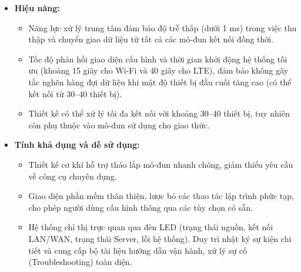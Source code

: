 \begin{itemize}
            \item \textbf{Hiệu năng:}
            \begin{itemize}
                \item Năng lực xử lý trung tâm đảm bảo độ trễ thấp (dưới 1 ms) trong việc thu thập và chuyển giao dữ liệu từ tất cả các mô-đun kết nối đồng thời.
                \item Tốc độ phản hồi giao diện cấu hình và thời gian khởi động hệ thống tối ưu (khoảng 15 giây cho Wi-Fi và 40 giây cho LTE), đảm bảo không gây tắc nghẽn hàng đợi dữ liệu khi mật độ thiết bị đầu cuối tăng cao (có thể kết nối từ 30--40 thiết bị).
                \item Thiết kế có thể xử lý tối đa kết nối với khoảng 30--40 thiết bị, tuy nhiên còn phụ thuộc vào mô-đun sử dụng cho giao thức.
            \end{itemize}
            
            \item \textbf{Tính khả dụng và dễ sử dụng:}
            \begin{itemize}
                \item Thiết kế cơ khí hỗ trợ tháo lắp mô-đun nhanh chóng, giảm thiểu yêu cầu về công cụ chuyên dụng.
                \item Giao diện phần mềm thân thiện, lược bỏ các thao tác lập trình phức tạp, cho phép người dùng cấu hình thông qua các tùy chọn có sẵn.
                \item Hệ thống chỉ thị trực quan qua đèn LED (trạng thái nguồn, kết nối LAN/WAN, trạng thái Server, lỗi hệ thống). Duy trì nhật ký sự kiện chi tiết và cung cấp bộ tài liệu hướng dẫn vận hành, xử lý sự cố (Troubleshooting) toàn diện.
            \end{itemize}
        \end{itemize}
    